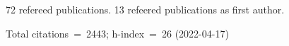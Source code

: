72 refereed publications. 13 refeered publications as first author.

Total citations~=~2443; h-index~=~26 (2022-04-17)